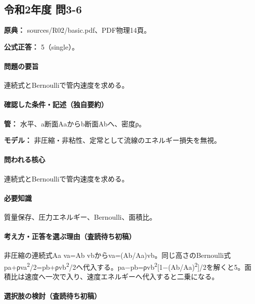 \subsection{令和2年度 問3-6}
\label{q:r02-reg-basic-3-6}

\noindent\textbf{原典：} sources/R02/basic.pdf、PDF物理14頁。

\textbf{公式正答：} 5（single）。

\paragraph{問題の要旨} 連続式とBernoulliで管内速度を求める。

\paragraph{確認した条件・記述（独自要約）}\mbox{}\par

\noindent\textbf{管：} 水平、a断面Aaからb断面Abへ、密度ρ。\par

\noindent\textbf{モデル：} 非圧縮・非粘性、定常として流線のエネルギー損失を無視。\par

\paragraph{問われる核心} 連続式とBernoulliで管内速度を求める。

\paragraph{必要知識} 質量保存、圧力エネルギー、Bernoulli、面積比。

\paragraph{考え方・正答を選ぶ理由（査読待ち初稿）} 非圧縮の連続式Aa va=\allowbreak{}Ab vbからva=\allowbreak{}(Ab/Aa)vb。同じ高さのBernoulli式pa+ρva\textsuperscript{2}/2=\allowbreak{}pb+ρvb\textsuperscript{2}/2へ代入する。pa−pb=ρvb\textsuperscript{2}[1−(Ab/Aa)\textsuperscript{2}]/2を解くと5。面積比は速度へ一次で入り、速度エネルギーへ代入すると二乗になる。

\paragraph{選択肢の検討（査読待ち初稿）}\mbox{}\par

